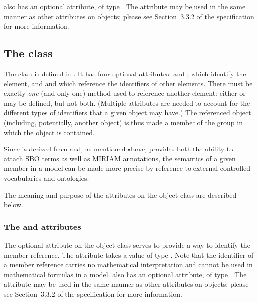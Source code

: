 \ListOfMembers also has an optional  attribute, of type .  The  attribute may be used in the same manner as other  attributes on \sbmlthreecore objects; please see Section~3.3.2 of the \sbmlthreecore specification for more information.


\subsection{The  class}
\label{member-class}

The \Member class is defined in .  It has four optional attributes:  and , which identify the element, and  and  which reference the identifiers of other elements.  There must be exactly \emph{one} (and only one) method used to reference another element: either  or  may be defined, but not both.  (Multiple attributes are needed to account for the different types of identifiers that a given object may have.)  The referenced object (including, potentially, another \Group object) is thus made a member of the group in which the \Member object is contained.

Since \Member is derived from \SBase and, as mentioned above, \SBase provides both the ability to attach SBO terms as well as MIRIAM annotations, the semantics of a given member in a model can be made more precise by reference to external controlled vocabularies and ontologies.

The meaning and purpose of the attributes on the object class are described below.


\subsubsection{The \fixttspace{} and \fixttspace{} attributes}
\label{member-idname-attributes}

The optional  attribute on the \Member object class serves to provide a way to identify the member reference.  The attribute takes a value of type .  Note that the identifier of a member reference carries no mathematical interpretation and cannot be used in mathematical formulas in a model.  \Member also has an optional  attribute, of type .  The  attribute may be used in the same manner as other  attributes on \sbmlthreecore objects; please see Section~3.3.2 of the \sbmlthreecore specification for more information.


